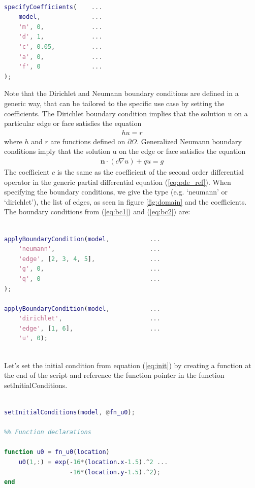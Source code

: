 \documentclass[11pt, a4paper]{article}
\begin{document}
\begin{lstlisting}[language=Matlab]
%% Specify the PDE model

specifyCoefficients(    ...
    model,              ...
    'm', 0,             ...
    'd', 1,             ...
    'c', 0.05,          ...
    'a', 0,             ...
    'f', 0              ...
);	
\end{lstlisting}

Note that the Dirichlet and Neumann boundary conditions are defined in a generic way, that can be tailored to the specific use case by setting the coefficients. The Dirichlet boundary condition implies that the solution u on a particular edge or face satisfies the equation
\begin{align}
	hu = r
\end{align}
where $h$ and $r$ are functions defined on $\partial \Omega$. Generalized Neumann boundary conditions imply that the solution u on the edge or face satisfies the equation
\begin{align}
\textbf{n}\cdot (c\nabla u) + qu = g	
\end{align}
The coefficient $c$ is the same as the coefficient of the second order differential operator in the generic partial differential equation (\ref{eq:pde_ref}). When specifying the boundary conditions, we give the type (e.g. `neumann' or `dirichlet'), the list of edges, as seen in figure \ref{fig:domain} and the coefficients. The boundary conditions from (\ref{eq:bc1}) and (\ref{eq:bc2}) are:

\begin{lstlisting}[language=Matlab]
%% Boundary conditions

applyBoundaryCondition(model,           ...
    'neumann', 							...
    'edge', [2, 3, 4, 5],  				...
    'g', 0,                             ...
    'q', 0                              ...
);

applyBoundaryCondition(model,           ...
    'dirichlet', 						...
    'edge', [1, 6],        				...
    'u', 0);
	
\end{lstlisting}

Let's set the initial condition from equation (\ref{eq:init}) by creating a function at the end of the script and reference the function pointer in the function setInitialConditions.

\begin{lstlisting}[language=Matlab]
%% Initial conditions.

setInitialConditions(model, @fn_u0);

%% Function declarations

function u0 = fn_u0(location)
    u0(1,:) = exp(-16*(location.x-1.5).^2 ...
                  -16*(location.y-1.5).^2);
end
\end{lstlisting}
\end{document}
